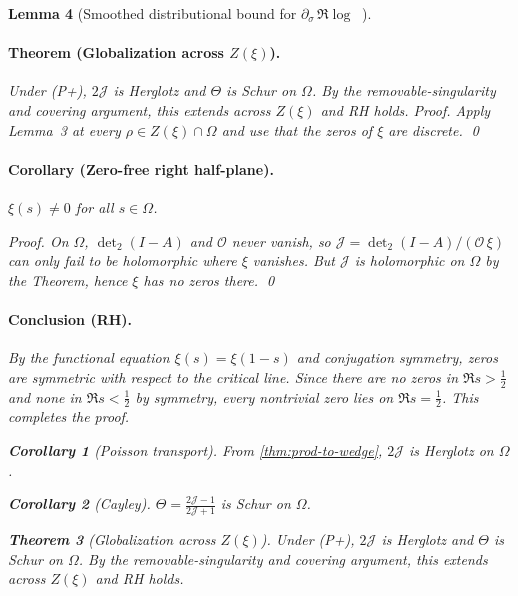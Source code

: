 \documentclass[11pt]{article}
\newtheorem{theorem}{Theorem}
\newtheorem{lemma}[theorem]{Lemma}
\newtheorem{corollary}[theorem]{Corollary}
\theoremstyle{definition}
\theoremstyle{remark}
\DeclareMathOperator{\dettwo}{det_2}
\begin{document}
\begin{lemma}[Smoothed distributional bound for $\partial_\sigma\,\Re\log\dettwo$]
\paragraph{Theorem (Globalization across $Z(\xi)$).}
Under (P+), $2\mathcal J$ is Herglotz and $\Theta$ is Schur on $\Omega$. By the removable-singularity and covering argument, this extends across $Z(\xi)$ and RH holds.
\emph{Proof.}
Apply Lemma~3 at every $\rho\in Z(\xi)\cap\Omega$ and use that the zeros of $\xi$ are discrete. \qed


\paragraph{Corollary (Zero-free right half-plane).}
$\xi(s)\neq 0$ for all $s\in\Omega$.


\emph{Proof.}
On $\Omega$, $\det_2(I-A)$ and $\mathcal O$ never vanish, so $\mathcal J=\det_2(I-A)/(\mathcal O\,\xi)$ can only fail to be holomorphic where $\xi$ vanishes. But $\mathcal J$ is holomorphic on $\Omega$ by the Theorem, hence $\xi$ has no zeros there. \qed


\paragraph{Conclusion (RH).}
By the functional equation $\xi(s)=\xi(1-s)$ and conjugation symmetry, zeros are symmetric with respect to the critical line. Since there are no zeros in $\Re s>\tfrac12$ and none in $\Re s<\tfrac12$ by symmetry, every nontrivial zero lies on $\Re s=\tfrac12$. This completes the proof.
\begin{corollary}[Poisson transport]\label{cor:poisson-herglotz}
From \ref{thm:prod-to-wedge}, $2\mathcal J$ is Herglotz on $\Omega$.
\end{corollary}

\begin{corollary}[Cayley]\label{cor:cayley-schur}
$\Theta=\frac{2\mathcal J-1}{2\mathcal J+1}$ is Schur on $\Omega$.
\end{corollary}

\begin{theorem}[Globalization across $Z(\xi)$]\label{thm:globalize-main}
Under (P+), $2\mathcal J$ is Herglotz and $\Theta$ is Schur on $\Omega$. By the removable-singularity and covering argument, this extends across $Z(\xi)$ and RH holds.
\end{theorem}


\end{lemma}
\end{document}
